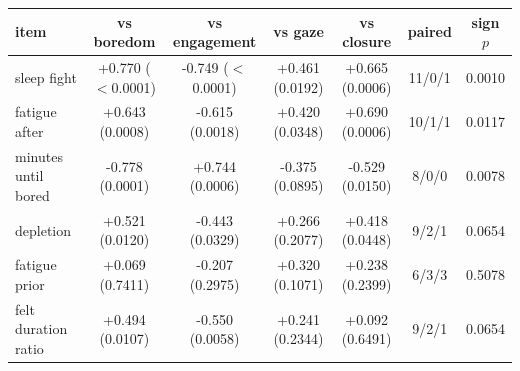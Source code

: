 \begin{tabular}{lcccccc}
\hline
item & vs boredom & vs engagement & vs gaze & vs closure & paired & sign $p$ \\
\hline
sleep fight & +0.770 ($<$0.0001) & -0.749 ($<$0.0001) & +0.461 (0.0192) & +0.665 (0.0006) & 11/0/1 & 0.0010 \\
fatigue after & +0.643 (0.0008) & -0.615 (0.0018) & +0.420 (0.0348) & +0.690 (0.0006) & 10/1/1 & 0.0117 \\
minutes until bored & -0.778 (0.0001) & +0.744 (0.0006) & -0.375 (0.0895) & -0.529 (0.0150) & 8/0/0 & 0.0078 \\
depletion & +0.521 (0.0120) & -0.443 (0.0329) & +0.266 (0.2077) & +0.418 (0.0448) & 9/2/1 & 0.0654 \\
fatigue prior & +0.069 (0.7411) & -0.207 (0.2975) & +0.320 (0.1071) & +0.238 (0.2399) & 6/3/3 & 0.5078 \\
felt duration ratio & +0.494 (0.0107) & -0.550 (0.0058) & +0.241 (0.2344) & +0.092 (0.6491) & 9/2/1 & 0.0654 \\
\hline
\end{tabular}
